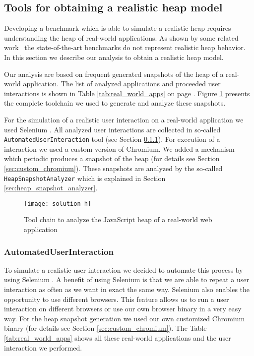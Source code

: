 \subsection{Tools for obtaining a realistic heap model}

Developing a benchmark which is able to simulate a realistic \JS heap requires understanding the heap of real-world applications. As shown by some related work~\cite{JSMeter2009,JSMeter2010,Richards2011} the state-of-the-art benchmarks do not represent realistic heap behavior. In this section we describe our analysis to obtain a realistic heap model.

Our analysis are based on frequent generated snapshots of the \JS heap of a real-world application. The list of analyzed applications and proceeded user interactions is shown in Table \ref{tab:real_world_apps} on page \pageref{tab:real_world_apps}.
Figure \ref{fig:heap_structure_analysis} presents the complete toolchain we used to generate and analyze these snapshots. 

For the simulation of a realistic user interaction on a real-world application we used Selenium \cite{Selenium}. All analyzed user interactions are collected in so-called \texttt{AutomatedUserInteraction} tool (see Section \ref{sec:automated_user_interaction}). For execution of a interaction we used a custom version of Chromium. We added a mechanism which periodic produces a snapshot of the \JS heap (for details see Section \ref{sec:custom_chromium}). These snapshots are analyzed by the so-called \texttt{HeapSnapshotAnalyzer} which is explained in Section \ref{sec:heap_snapshot_analyzer}.

\begin{figure}
	\centering
	\texttt{[image: solution\_h]}
	\caption{Tool chain to analyze the JavaScript heap of a real-world web application}
	\label{fig:heap_structure_analysis}
\end{figure}


	
\subsubsection{AutomatedUserInteraction} \label{sec:automated_user_interaction}
To simulate a realistic user interaction we decided to automate this process by using Selenium \cite{Selenium}. A benefit of using Selenium is that we are able to repeat a user interaction as often as we want in exact the same way. Selenium also enables the opportunity to use different browsers. This feature allows us to run a user interaction on different browsers or use our own browser binary in a very easy way. For the heap snapshot generation we used our own customized Chromium binary (for details see Section \ref{sec:custom_chromium}). The Table \ref{tab:real_world_apps} shows all these real-world applications and the user interaction we performed. 

